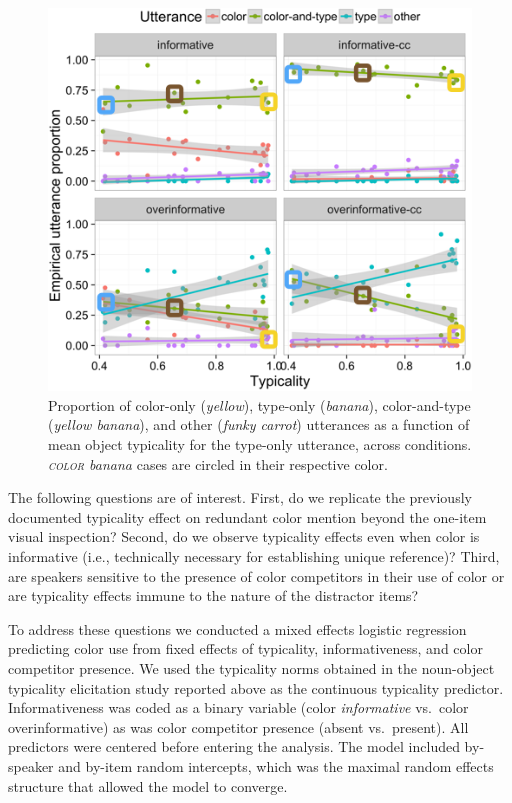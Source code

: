 \documentclass[10pt,letterpaper]{article}
\begin{document}
\begin{figure}[bt]
\centering
\includegraphics[width=.5\textwidth]{graphs/results1.png}
\caption{Proportion of color-only (\emph{yellow}), type-only (\emph{banana}), color-and-type (\emph{yellow banana}), and other (\emph{funky carrot}) utterances as a function of mean object typicality for the type-only utterance, across conditions. \emph{\textsc{color} banana} cases are circled in their respective color.}
\label{fig:proportions}
\end{figure}

The following questions are of interest. First, do we replicate the previously documented typicality effect on redundant color mention beyond the one-item visual inspection? Second, do we observe typicality effects even when color is informative (i.e., technically necessary for establishing unique reference)? Third, are speakers sensitive to the presence of color competitors in their use of color or are typicality effects immune to the nature of the distractor items?

To address these questions we conducted a mixed effects logistic regression predicting color use from fixed effects of typicality, informativeness, and color competitor presence. We used the typicality norms obtained in the noun-object typicality elicitation study reported above as the continuous typicality predictor. Informativeness was coded as a binary variable (color \emph{informative} vs.~color overinformative) as was color competitor presence (absent vs.~present). All predictors were centered before entering the analysis. The model included by-speaker and by-item random intercepts, which was the maximal random effects structure that allowed the model to converge.
\end{document}
